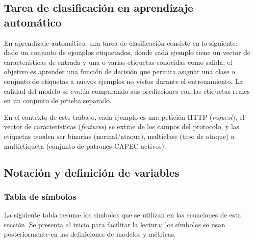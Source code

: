 \documentclass[12pt,oneside]{report}
\begin{document}
\subsection{Tarea de clasificación en aprendizaje automático}

En aprendizaje automático, una tarea de clasificación consiste en lo siguiente: dado un conjunto de ejemplos etiquetados, donde cada ejemplo tiene un vector de características de entrada y una o varias etiquetas conocidas como salida, el objetivo es aprender una función de decisión que permita asignar una clase o conjunto de etiquetas a nuevos ejemplos no vistos durante el entrenamiento. La calidad del modelo se evalúa comparando sus predicciones con las etiquetas reales en un conjunto de prueba separado.

En el contexto de este trabajo, cada ejemplo es una petición HTTP (\textit{request}), el vector de características (\textit{features}) se extrae de los campos del protocolo, y las etiquetas pueden ser binarias (normal/ataque), multiclase (tipo de ataque) o multietiqueta (conjunto de patrones CAPEC activos).

\subsection{Notación y definición de variables}

\subsubsection{Tabla de símbolos}

La siguiente tabla resume los símbolos que se utilizan en las ecuaciones de esta sección. Se presenta al inicio para facilitar la lectura; los símbolos se usan posteriormente en las definiciones de modelos y métricas.
\end{document}
